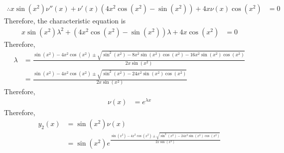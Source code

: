 \documentclass[fleqn, a4paper, 11pt, oneside]{amsart}
\theoremstyle{definition}
\theoremstyle{theorem}
\begin{document}
\begin{solution}
\begin{enumerate}[leftmargin = *]
			\begin{align*}
				\therefore x \sin(x^2) \nu''(x) + \nu'(x) \left(4 x^2 \cos(x^2) - \sin(x^2) \right) + 4 x \nu(x) \cos(x^2) &= 0
			\end{align*}
			Therefore, the characteristic equation is
			\begin{align*}
				x \sin(x^2) \lambda^2 + \left(4 x^2 \cos(x^2) - \sin(x^2) \right) \lambda + 4 x \cos(x^2) &= 0
			\end{align*}
			Therefore,
			\begin{align*}
				\lambda &= \frac{\sin(x^2) - 4 x^2 \cos(x^2) \pm \sqrt{\sin^2(x^2) - 8 x^2 \sin(x^2) \cos(x^2) - 16 x^2 \sin(x^2) \cos(x^2)}}{2 x \sin(x^2)}\\
				&= \frac{\sin(x^2) - 4 x^2 \cos(x^2) \pm \sqrt{\sin^2(x^2) - 24 x^2 \sin(x^2) \cos(x^2)}}{2 x \sin(x^2)}
			\end{align*}
			Therefore,
			\begin{align*}
				\nu(x) &= e^{\lambda x}
			\end{align*}
			Therefore,
			\begin{align*}
				y_2(x) &= \sin(x^2) \nu(x)\\
				&= \sin(x^2) e^{\frac{\sin(x^2) - 4 x^2 \cos(x^2) \pm \sqrt{\sin^2(x^2) - 24 x^2 \sin(x^2) \cos(x^2)}}{2 x \sin(x^2)}}
			\end{align*}
	\end{enumerate}
\end{solution}
\end{document}
